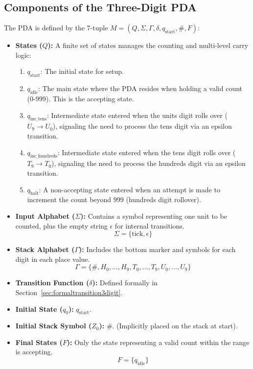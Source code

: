 \documentclass[11pt]{article}
\begin{document}
\subsection{Components of the Three-Digit PDA}
The PDA is defined by the 7-tuple $M = (Q, \Sigma, \Gamma, \delta, q_{\text{start}}, \#, F)$:
\begin{itemize}
    \item \textbf{States ($Q$):} A finite set of states manages the counting and multi-level carry logic:
    \begin{enumerate}
        \item $q_{\text{start}}$: The initial state for setup.
        \item $q_{\text{idle}}$: The main state where the PDA resides when holding a valid count (0-999). This is the accepting state.
        \item $q_{\text{inc\_tens}}$: Intermediate state entered when the units digit rolls over ($U_9 \rightarrow U_0$), signaling the need to process the tens digit via an epsilon transition.
        \item $q_{\text{inc\_hundreds}}$: Intermediate state entered when the tens digit rolls over ($T_9 \rightarrow T_0$), signaling the need to process the hundreds digit via an epsilon transition.
        \item $q_{\text{halt}}$: A non-accepting state entered when an attempt is made to increment the count beyond 999 (hundreds digit rollover).
    \end{enumerate}
    \item \textbf{Input Alphabet ($\Sigma$):} Contains a symbol representing one unit to be counted, plus the empty string $\epsilon$ for internal transitions.
    \[ \Sigma = \{ \text{tick}, \epsilon \} \]
    \item \textbf{Stack Alphabet ($\Gamma$):} Includes the bottom marker and symbols for each digit in each place value.
    \[ \Gamma = \{ \#, H_0, \dots, H_9, T_0, \dots, T_9, U_0, \dots, U_9 \} \]
    \item \textbf{Transition Function ($\delta$):} Defined formally in Section~\ref{sec:formaltransition3digit}.
    \item \textbf{Initial State ($q_0$):} $q_{\text{start}}$.
    \item \textbf{Initial Stack Symbol ($Z_0$):} $\#$. (Implicitly placed on the stack at start).
    \item \textbf{Final States ($F$):} Only the state representing a valid count within the range is accepting.
    \[ F = \{ q_{\text{idle}} \} \]
\end{itemize}
\end{document}
